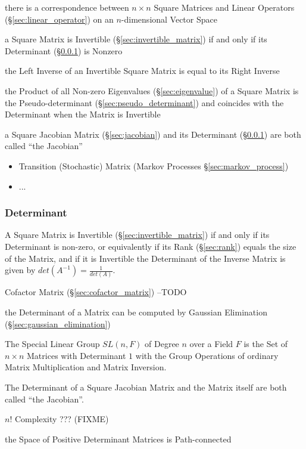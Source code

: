 there is a correspondence between $n\times{n}$ Square Matrices and Linear
Operators (\S\ref{sec:linear_operator}) on an $n$-dimensional Vector Space

a Square Matrix is Invertible (\S\ref{sec:invertible_matrix}) if and only if
its Determinant (\S\ref{sec:determinant}) is Nonzero

the Left Inverse of an Invertible Square Matrix is equal to its Right Inverse

the Product of all Non-zero Eigenvalues (\S\ref{sec:eigenvalue}) of a Square
Matrix is the Pseudo-determinant (\S\ref{sec:pseudo_determinant}) and coincides
with the Determinant when the Matrix is Invertible

a Square Jacobian Matrix (\S\ref{sec:jacobian}) and its Determinant
(\S\ref{sec:determinant}) are both called ``the Jacobian''

\begin{itemize}
  \item Transition (Stochastic) Matrix (Markov Processes
    \S\ref{sec:markov_process})
  \item ...
\end{itemize}



\subsubsection{Determinant}\label{sec:determinant}

A Square Matrix is Invertible (\S\ref{sec:invertible_matrix}) if and only if
its Determinant is non-zero, or equivalently if its Rank (\S\ref{sec:rank})
equals the size of the Matrix, and if it is Invertible the Determinant of the
Inverse Matrix is given by $det(A^{-1}) = \frac{1}{det(A)}$.

Cofactor Matrix (\S\ref{sec:cofactor_matrix}) --TODO

\fist the Determinant of a Matrix can be computed by Gaussian Elimination
(\S\ref{sec:gaussian_elimination})

The Special Linear Group $SL(n,F)$ of Degree $n$ over a Field $F$ is the Set of
$n \times n$ Matrices with Determinant $1$ with the Group Operations of
ordinary Matrix Multiplication and Matrix Inversion.

The Determinant of a Square Jacobian Matrix and the Matrix itself are both
called ``the Jacobian''.

$n!$ Complexity ??? (FIXME)

the Space of Positive Determinant Matrices is Path-connected



